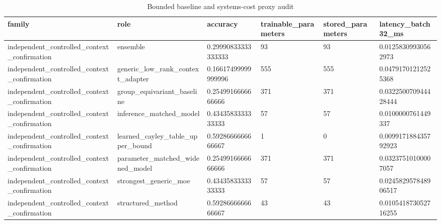 \begin{table}[t]
\centering
\caption{Bounded baseline and systems-cost proxy audit}
\begin{tabular}{llllll}
\toprule
family & role & accuracy & trainable\_parameters & stored\_parameters & latency\_batch32\_ms \\
\midrule
independent\_controlled\_context\_confirmation & ensemble & 0.29990833333333333 & 93 & 93 & 0.01258309930562973 \\
independent\_controlled\_context\_confirmation & generic\_low\_rank\_context\_adapter & 0.16617499999999996 & 555 & 555 & 0.04791701212525368 \\
independent\_controlled\_context\_confirmation & group\_equivariant\_baseline & 0.2549916666666666 & 371 & 371 & 0.032250070944428444 \\
independent\_controlled\_context\_confirmation & inference\_matched\_model & 0.4343583333333333 & 57 & 57 & 0.0100000761449337 \\
independent\_controlled\_context\_confirmation & learned\_cayley\_table\_upper\_bound & 0.5928666666666667 & 1 & 0 & 0.009917188435792923 \\
independent\_controlled\_context\_confirmation & parameter\_matched\_widened\_model & 0.2549916666666666 & 371 & 371 & 0.03237510100007057 \\
independent\_controlled\_context\_confirmation & strongest\_generic\_moe & 0.4343583333333333 & 57 & 57 & 0.024582957848906517 \\
independent\_controlled\_context\_confirmation & structured\_method & 0.5928666666666667 & 43 & 43 & 0.010541873052716255 \\
\bottomrule
\end{tabular}
\end{table}

